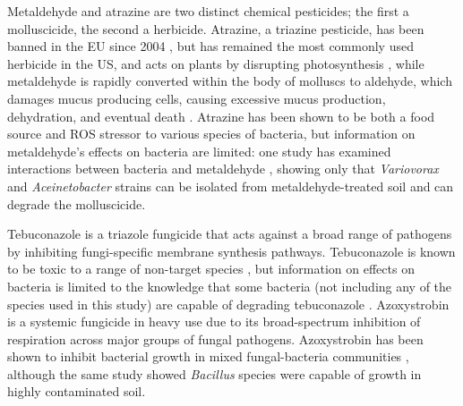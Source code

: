 \documentclass[final,1p,times]{elsarticle}
\begin{document}
Metaldehyde and atrazine are two distinct chemical pesticides; the first a molluscicide, the second a herbicide. Atrazine, a triazine pesticide, has been banned in the EU since 2004 \cite{EU2004}, but has remained the most commonly used herbicide in the US, and acts on plants by disrupting photosynthesis \cite{Shimabukuro1969}, while metaldehyde is rapidly converted within the body of molluscs to aldehyde, which damages mucus producing cells, causing excessive mucus production, dehydration, and eventual death \cite{Triebskorn1998}. Atrazine has been shown to be both a food source \cite{Wackett2002} and ROS stressor \cite{Zhang2012} to various species of bacteria, but information on metaldehyde’s effects on bacteria are limited: one study has examined interactions between bacteria and metaldehyde \cite{Thomas2017}, showing only that \textit{Variovorax} and \textit{Aceinetobacter} strains can be isolated from metaldehyde-treated soil and can degrade the molluscicide.

Tebuconazole is a triazole fungicide that acts against a broad range of pathogens by inhibiting fungi-specific membrane synthesis pathways. Tebuconazole is known to be toxic to a range of non-target species \cite{Sehnem2010}, but information on effects on bacteria is limited to the knowledge that some bacteria (not including any of the species used in this study) are capable of degrading tebuconazole \cite{Sehnem2010}. Azoxystrobin is a systemic fungicide in heavy use due to its broad-spectrum inhibition of respiration across major groups of fungal pathogens. Azoxystrobin has been shown to inhibit bacterial growth in mixed fungal-bacteria communities \cite{Bacmaga2015MicrobialAzoxystrobin}, although the same study showed \textit{Bacillus} species were capable of growth in highly contaminated soil.

\end{document}
